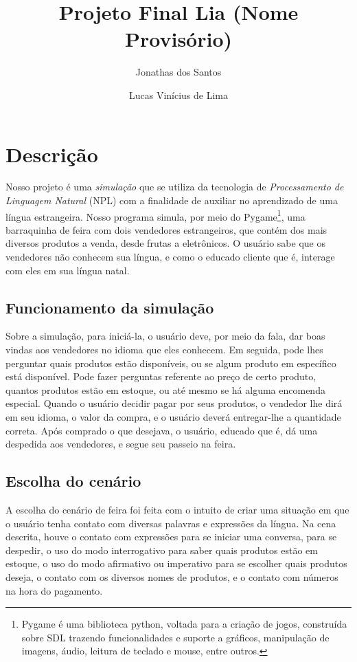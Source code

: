 \documentclass[a4paper]{article}
\title{Projeto Final Lia (Nome Provisório)}
\author{Jonathas dos Santos \and Lucas Vinícius de Lima}
\begin{document}
    \maketitle
    
    \section{Descrição}
        Nosso projeto é uma \emph{simulação} que se utiliza da tecnologia de
        \emph{Processamento de Linguagem Natural} (NPL) com a finalidade de
        auxiliar no aprendizado de uma língua estrangeira. Nosso programa
        simula, por meio do Pygame\footnote{Pygame é uma biblioteca python,
        voltada para a criação de jogos, construída sobre SDL trazendo
        funcionalidades e suporte a gráficos, manipulação de imagens, áudio,
        leitura de teclado e mouse, entre outros.}, uma barraquinha de feira com
        dois vendedores estrangeiros, que contém dos mais diversos produtos a
        venda, desde frutas a eletrônicos. O usuário sabe que os vendedores não
        conhecem sua língua, e como o educado cliente que é, interage com eles
        em sua língua natal. 

    \subsection{Funcionamento da simulação}

        Sobre a simulação, para iniciá-la, o usuário deve, por meio da fala, dar
        boas vindas aos vendedores no idioma que eles conhecem. Em seguida,
        pode lhes perguntar quais produtos estão disponíveis, ou se algum
        produto em específico está disponível. Pode fazer perguntas referente ao
        preço de certo produto, quantos produtos estão em estoque, ou até mesmo
        se há alguma encomenda especial. Quando o usuário decidir pagar por seus
        produtos, o vendedor lhe dirá em seu idioma, o valor da compra, e o
        usuário deverá entregar-lhe a quantidade correta. Após comprado o que
        desejava, o usuário, educado que é, dá uma despedida aos vendedores, e
        segue seu passeio na feira.

    \subsection{Escolha do cenário}

        A escolha do cenário de feira foi feita com o intuito de criar uma
        situação em que o usuário tenha contato com diversas palavras e
        expressões da língua. Na cena descrita, houve o contato com expressões
        para se iniciar uma conversa, para se despedir, o uso do modo
        interrogativo para saber quais produtos estão em estoque, o uso do modo
        afirmativo ou imperativo para se escolher quais produtos deseja, o
        contato com os diversos nomes de produtos, e o contato com números na
        hora do pagamento. 
\end{document}
